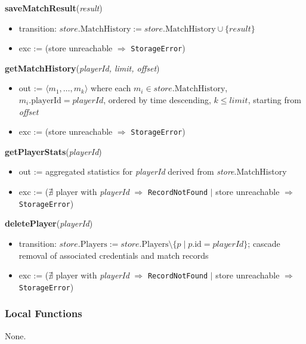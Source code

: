 \documentclass[12pt, titlepage]{article}
\begin{document}
\noindent\textbf{saveMatchResult}(\textit{result})
\begin{itemize}
    \item transition: $\textit{store}.\text{MatchHistory} := \textit{store}.\text{MatchHistory} \cup \{\textit{result}\}$
    \item exc := (store unreachable $\Rightarrow$ \texttt{StorageError})
\end{itemize}

\noindent\textbf{getMatchHistory}(\textit{playerId, limit, offset})
\begin{itemize}
    \item out := $\langle m_1, \ldots, m_k \rangle$ where each $m_i \in \textit{store}.\text{MatchHistory}$, $m_i.\text{playerId} = \textit{playerId}$, ordered by time descending, $k \leq \textit{limit}$, starting from \textit{offset}
    \item exc := (store unreachable $\Rightarrow$ \texttt{StorageError})
\end{itemize}

\noindent\textbf{getPlayerStats}(\textit{playerId})
\begin{itemize}
    \item out := aggregated statistics for \textit{playerId} derived from \textit{store}.MatchHistory
    \item exc := ($\nexists$ player with \textit{playerId} $\Rightarrow$ \texttt{RecordNotFound} $|$ store unreachable $\Rightarrow$ \texttt{StorageError})
\end{itemize}

\noindent\textbf{deletePlayer}(\textit{playerId})
\begin{itemize}
    \item transition: $\textit{store}.\text{Players} := \textit{store}.\text{Players} \setminus \{\textit{p} \mid \textit{p}.\text{id} = \textit{playerId}\}$; cascade removal of associated credentials and match records
    \item exc := ($\nexists$ player with \textit{playerId} $\Rightarrow$ \texttt{RecordNotFound} $|$ store unreachable $\Rightarrow$ \texttt{StorageError})
\end{itemize}

\subsubsection{Local Functions}
None.
\end{document}
